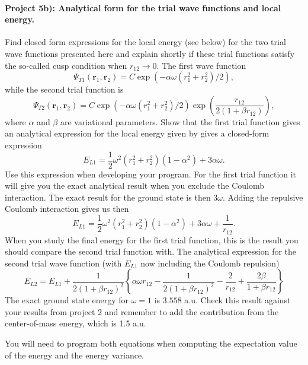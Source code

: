 \documentclass[%
oneside,                 %
final,                   %
10pt]{article}
\begin{document}
\paragraph{Project 5b): Analytical form for the trial wave functions and local energy.}
Find closed form expressions for the local energy (see below) for the 
two trial wave functions presented here and explain shortly if these
trial functions satisfy 
the so-called cusp condition when $r_{12}\rightarrow 0$.
The first wave function
\[
   \Psi_{T1}(\mathbf{r}_1,\mathbf{r}_2) = C\exp{\left(-\alpha\omega(r_1^2+r_2^2)/2\right)},
\]
while the second trial function is
\[
    \Psi_{T2}(\mathbf{r}_1,\mathbf{r}_2) =
    C\exp{\left(-\alpha\omega(r_1^2+r_2^2)/2\right)}
    \exp{\left(\frac{r_{12}}{2(1+\beta r_{12})}\right)},
\]
where $\alpha$ and $\beta$ are variational parameters.
Show that the first trial function gives an analytical expression for the local energy given by
gives a closed-form expression
\[ 
E_{L1} = \frac{1}{2}\omega^2\left( r_1^2+r_2^2\right)\left(1-\alpha^2\right) +3\alpha\omega.
\]
Use this expression when developing your program. 
For the first trial function it will give you the exact analytical result when you exclude the Coulomb interaction. The exact result for the ground state is then $3\omega$. 
Adding the repulsive Coulomb interaction gives us then
\[ 
E_{L1} = \frac{1}{2}\omega^2\left( r_1^2+r_2^2\right)\left(1-\alpha^2\right) +3\alpha\omega+\frac{1}{r_{12}}.
\]
When you study the final energy for the first trial function, this is the result you should compare the second trial function with.
The analytical expression for the second trial wave function (with $E_{L1}$ now including the Coulomb repulsion)
\[ 
E_{L2} = E_{L1}+\frac{1}{2(1+\beta r_{12})^2}\left\{\alpha\omega r_{12}-\frac{1}{2(1+\beta r_{12})^2}-\frac{2}{r_{12}}+\frac{2\beta}{1+\beta r_{12}}\right\}
\]
The exact ground state energy for $\omega =1 $ is $3.558$ a.u. Check this result against your results from project 2 and remember to add the contribution from the center-of-mass energy, which is 1.5 a.u.

You will need to program both equations when computing the expectation value of the energy and the energy variance.
\end{document}
